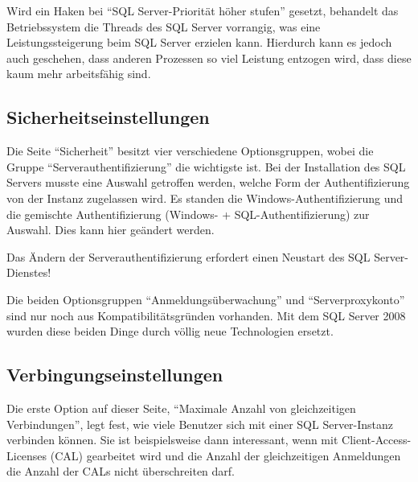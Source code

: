         Wird ein Haken bei \enquote{SQL Server-Priorität höher stufen}
        gesetzt, behandelt das Betriebssystem die Threads des SQL Server
        vorrangig, was eine Leistungssteigerung beim SQL Server erzielen kann.
        Hierdurch kann es jedoch auch geschehen, dass anderen Prozessen so
        viel Leistung entzogen wird, dass diese kaum mehr arbeitsfähig sind.
        \begin{literaturinternet}
          \item \cite{ms189629}
        \end{literaturinternet}          
      \subsection{Sicherheitseinstellungen}
        Die Seite \enquote{Sicherheit} besitzt vier verschiedene
        Optionsgruppen, wobei die Gruppe \enquote{Serverauthentifizierung} die
        wichtigste ist. Bei der Installation des SQL Servers musste
        eine Auswahl getroffen werden, welche Form der Authentifizierung von
        der Instanz zugelassen wird. Es standen die Windows-Authentifizierung
        und die gemischte Authentifizierung (Windows- + SQL-Authentifizierung)
        zur Auswahl. Dies kann hier geändert werden.
        \begin{merke}
          Das Ändern der Serverauthentifizierung erfordert einen Neustart des
          SQL Server-Dienstes!
        \end{merke}
        Die beiden Optionsgruppen \enquote{Anmeldungsüberwachung} und
        \enquote{Serverproxykonto} sind nur noch aus Kompatibilitätsgründen
        vorhanden. Mit dem SQL Server 2008 wurden diese beiden Dinge durch
        völlig neue Technologien ersetzt.
        \begin{literaturinternet}
          \item \cite{ms188470}
        \end{literaturinternet}          
      \subsection{Verbingungseinstellungen}
        Die erste Option auf dieser Seite, \enquote{Maximale Anzahl von
        gleichzeitigen Verbindungen}, legt fest, wie viele Benutzer sich mit
        einer SQL Server-Instanz verbinden können. Sie ist beispielsweise dann
        interessant, wenn mit Client-Access-Licenses (CAL) gearbeitet wird und
        die Anzahl der gleichzeitigen Anmeldungen die Anzahl der CALs nicht
        überschreiten darf.
        
